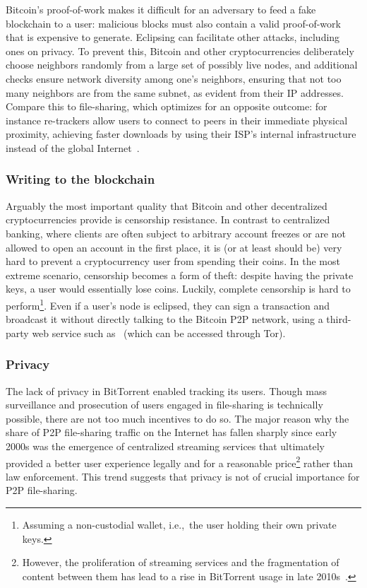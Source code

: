 Bitcoin's proof-of-work makes it difficult for an adversary to feed a fake blockchain to a user: malicious blocks must also contain a valid proof-of-work that is expensive to generate.
Eclipsing can facilitate other attacks, including ones on privacy.
To prevent this, Bitcoin and other cryptocurrencies deliberately choose neighbors randomly from a large set of possibly live nodes, and additional checks ensure network diversity among one's neighbors, ensuring that not too many neighbors are from the same subnet, as evident from their IP addresses.
Compare this to file-sharing, which optimizes for an opposite outcome: for instance re-trackers allow users to connect to peers in their immediate physical proximity, achieving faster downloads by using their ISP's internal infrastructure instead of the global Internet~\cite{Yoshida2012,Wang2012}.

\subsubsection*{Writing to the blockchain}
Arguably the most important quality that Bitcoin and other decentralized cryptocurrencies provide is censorship resistance.
In contrast to centralized banking, where clients are often subject to arbitrary account freezes or are not allowed to open an account in the first place, it is (or at least should be) very hard to prevent a cryptocurrency user from spending their coins.
In the most extreme scenario, censorship becomes a form of theft: despite having the private keys, a user would essentially lose coins.
Luckily, complete censorship is hard to perform\footnote{Assuming a non-custodial wallet, i.e.,~the user holding their own private keys.}.
Even if a user's node is eclipsed, they can sign a transaction and broadcast it without directly talking to the Bitcoin P2P network, using a third-party web service such as~\cite{Blockstream} (which can be accessed through Tor).

\subsubsection*{Privacy}
The lack of privacy in BitTorrent enabled tracking its users.
Though mass surveillance and prosecution of users engaged in file-sharing is technically possible, there are not too much incentives to do so.
The major reason why the share of P2P file-sharing traffic on the Internet has fallen sharply since early 2000s was the emergence of centralized streaming services that ultimately provided a better user experience legally and for a reasonable price\footnote{However, the proliferation of streaming services and the fragmentation of content between them has lead to a rise in BitTorrent usage in late 2010s~\cite{Bode2018}.} rather than law enforcement.
This trend suggests that privacy is not of crucial importance for P2P file-sharing.

